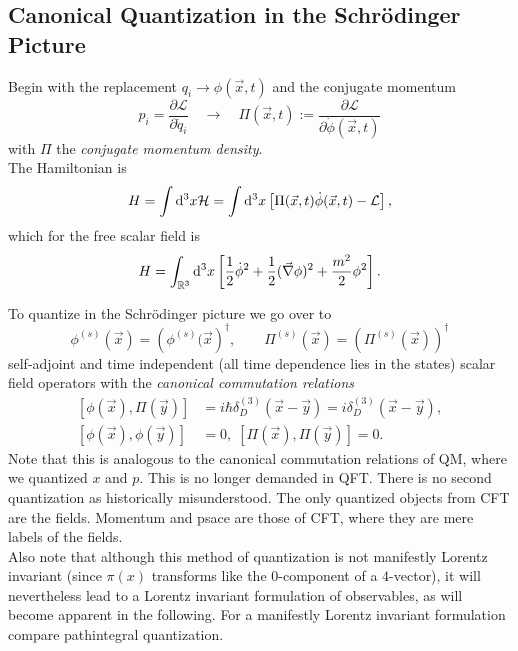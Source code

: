 \subsection{Canonical Quantization in the Schrödinger Picture}
Begin with the replacement $q_i \rightarrow \phi(\vec{x},t)$ and the conjugate momentum 
\begin{equation}
	p_i = \frac{\partial \mathcal{L}}{\partial \dot{q}_i} \quad \rightarrow \quad \Pi(\vec{x},t):= \frac{\partial \mathcal{L}}{\partial \dot{\phi}(\vec{x},t)}
\end{equation}
with $\Pi$ the \emph{conjugate momentum density}.\\
The Hamiltonian is
\begin{equation}
	H=\int \mathrm{d}^3x\mathcal{H} =\int \mathrm{d}^3 x \left[\Pi(\vec{x},t) \dot{\phi}(\vec{x},t) - \mathcal{L}\right],
\end{equation}
which for the free scalar field is
\begin{equation}
	H = \int_{\mathbb{R}^3} \mathrm{d}^3 x \left[\frac{1}{2} \dot{\phi}^2 + \frac{1}{2} (\vec{\nabla} \phi)^2+ \frac{m^2}{2} \phi^2 \right].
\end{equation}

To quantize in the Schrödinger picture we go over to
\begin{equation}
	\phi^{(s)} (\vec{x}) = \left(\phi^{(s)}(\vec{x}\right)^{\dagger}, \qquad \Pi^{(s)}(\vec{x})=\left(\Pi^{(s)} (\vec{x})\right)^{\dagger}
\end{equation}
self-adjoint and time independent (all time dependence lies in the states) scalar field operators with the \emph{canonical commutation relations}
\begin{align}
	\left[\phi(\vec{x}),\Pi(\vec{y}) \right] &= i \hbar \delta^{(3)}_D (\vec{x}-\vec{y})= i \delta^{(3)}_D (\vec{x}-\vec{y}),\\
	 \left[\phi(\vec{x}), \phi(\vec{y})\right]&=0, \; \left[\Pi(\vec{x}), \Pi(\vec{y})\right]=0.
\end{align}
Note that this is analogous to the canonical commutation relations of QM, where we quantized $x$ and $p$. This is no longer demanded in QFT. There is no second quantization as historically misunderstood. The only quantized objects from CFT are the fields. Momentum and psace are those of CFT, where they are mere labels of the fields.\\
Also note that although this method of quantization is not manifestly Lorentz invariant (since $\pi(x)$ transforms like the $0$-component of a $4$-vector), it will nevertheless lead to a Lorentz invariant formulation of observables, as will become apparent in the following. For a manifestly Lorentz invariant formulation compare pathintegral quantization.
